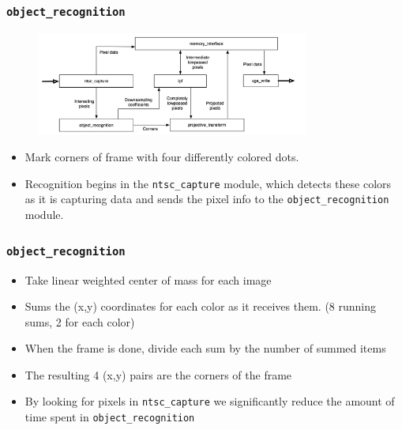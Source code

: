 \documentclass{beamer}
\begin{document}
\begin{frame}
	\frametitle{{\tt object\_recognition}}

	\begin{figure}
		\centering
		\includegraphics[width=0.8\textwidth]{../proposal/simplified_block_diagram.png}
	\end{figure}
	
	\begin{itemize}
		\item Mark corners of frame with four differently colored dots.
		\item Recognition begins in the {\tt ntsc\_capture} module, which detects these colors as it is capturing data and sends the pixel info to the {\tt object\_recognition} module.
		
	\end{itemize}
\end{frame}

\begin{frame}
	\frametitle{{\tt object\_recognition}}

	\begin{itemize}
		\item Take linear weighted center of mass for each image
		\item Sums the (x,y) coordinates for each color as it receives them. (8 running sums, 2 for each color)
		\item When the frame is done, divide each sum by the number of summed items
		\item The resulting 4 (x,y) pairs are the corners of the frame
		\item By looking for pixels in {\tt ntsc\_capture} we significantly reduce the amount of time spent in {\tt object\_recognition}
	\end{itemize}
\end{frame}

\end{document}

